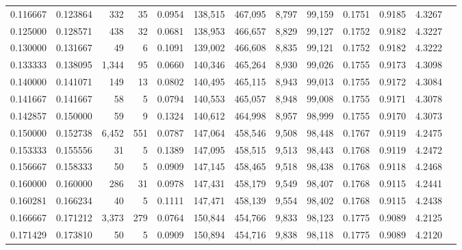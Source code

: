 \begin{tabular}{rrrrrrrrrrrrr}
0.116667 & 0.123864 &    332 &     35 &                                     0.0954 & 138,515 & 467,095 &   8,797 &  99,159 & 0.1751 & 0.9185 & 4.3267 \\
0.125000 & 0.128571 &    438 &     32 &                                     0.0681 & 138,953 & 466,657 &   8,829 &  99,127 & 0.1752 & 0.9182 & 4.3227 \\
0.130000 & 0.131667 &     49 &      6 &                                     0.1091 & 139,002 & 466,608 &   8,835 &  99,121 & 0.1752 & 0.9182 & 4.3222 \\
0.133333 & 0.138095 &  1,344 &     95 &                                     0.0660 & 140,346 & 465,264 &   8,930 &  99,026 & 0.1755 & 0.9173 & 4.3098 \\
0.140000 & 0.141071 &    149 &     13 &                                     0.0802 & 140,495 & 465,115 &   8,943 &  99,013 & 0.1755 & 0.9172 & 4.3084 \\
0.141667 & 0.141667 &     58 &      5 &                                     0.0794 & 140,553 & 465,057 &   8,948 &  99,008 & 0.1755 & 0.9171 & 4.3078 \\
0.142857 & 0.150000 &     59 &      9 &                                     0.1324 & 140,612 & 464,998 &   8,957 &  98,999 & 0.1755 & 0.9170 & 4.3073 \\
0.150000 & 0.152738 &  6,452 &    551 &                                     0.0787 & 147,064 & 458,546 &   9,508 &  98,448 & 0.1767 & 0.9119 & 4.2475 \\
0.153333 & 0.155556 &     31 &      5 &                                     0.1389 & 147,095 & 458,515 &   9,513 &  98,443 & 0.1768 & 0.9119 & 4.2472 \\
0.156667 & 0.158333 &     50 &      5 &                                     0.0909 & 147,145 & 458,465 &   9,518 &  98,438 & 0.1768 & 0.9118 & 4.2468 \\
0.160000 & 0.160000 &    286 &     31 &                                     0.0978 & 147,431 & 458,179 &   9,549 &  98,407 & 0.1768 & 0.9115 & 4.2441 \\
0.160281 & 0.166234 &     40 &      5 &                                     0.1111 & 147,471 & 458,139 &   9,554 &  98,402 & 0.1768 & 0.9115 & 4.2438 \\
0.166667 & 0.171212 &  3,373 &    279 &                                     0.0764 & 150,844 & 454,766 &   9,833 &  98,123 & 0.1775 & 0.9089 & 4.2125 \\
0.171429 & 0.173810 &     50 &      5 &                                     0.0909 & 150,894 & 454,716 &   9,838 &  98,118 & 0.1775 & 0.9089 & 4.2120 \\

\end{tabular}
